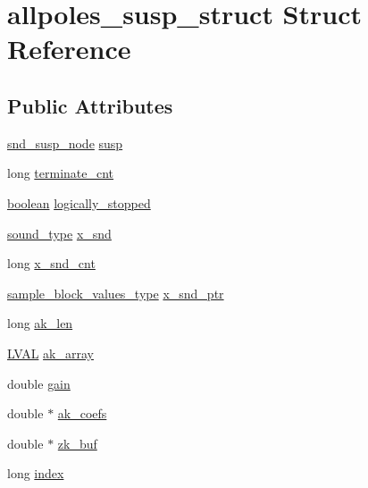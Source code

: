 \hypertarget{structallpoles__susp__struct}{}\section{allpoles\+\_\+susp\+\_\+struct Struct Reference}
\label{structallpoles__susp__struct}
\subsection*{Public Attributes}
\begin{DoxyCompactItemize}
\item 
\hyperlink{sound_8h_a6b268203688a934bd798ceb55f85d4c0}{snd\+\_\+susp\+\_\+node} \hyperlink{structallpoles__susp__struct_a9362e843e7e4cc86704db769e4b7a0ae}{susp}
\item 
long \hyperlink{structallpoles__susp__struct_a1bde6be2baac1d6534ba366a56c4de17}{terminate\+\_\+cnt}
\item 
\hyperlink{cext_8h_a7670a4e8a07d9ebb00411948b0bbf86d}{boolean} \hyperlink{structallpoles__susp__struct_a7bbede0decbc7893b76293aeabc465bd}{logically\+\_\+stopped}
\item 
\hyperlink{sound_8h_a792cec4ed9d6d636d342d9365ba265ea}{sound\+\_\+type} \hyperlink{structallpoles__susp__struct_af59b0583ecdc497b601e1e575b9e2c7e}{x\+\_\+snd}
\item 
long \hyperlink{structallpoles__susp__struct_a2534670add4338a67fed6d4dcfb67ed7}{x\+\_\+snd\+\_\+cnt}
\item 
\hyperlink{sound_8h_a83d17f7b465d1591f27cd28fc5eb8a03}{sample\+\_\+block\+\_\+values\+\_\+type} \hyperlink{structallpoles__susp__struct_aea5dfcb7280aab786a437d7157f22f6f}{x\+\_\+snd\+\_\+ptr}
\item 
long \hyperlink{structallpoles__susp__struct_a29aa697d50583d6db64a67d30b8cbdf2}{ak\+\_\+len}
\item 
\hyperlink{xldmem_8h_a9a9ec6a5fbca2b40ed8d19faa799be8c}{L\+V\+AL} \hyperlink{structallpoles__susp__struct_a9d4a5afcf3bade4bd6d4ce56926f5ba0}{ak\+\_\+array}
\item 
double \hyperlink{structallpoles__susp__struct_a365ab08384c35bab89ff00481a43f3b2}{gain}
\item 
double $\ast$ \hyperlink{structallpoles__susp__struct_ac2ebf26d0f6dcab575ae7c576a197f0f}{ak\+\_\+coefs}
\item 
double $\ast$ \hyperlink{structallpoles__susp__struct_a47455dbded9afab370b62a2efd3f8690}{zk\+\_\+buf}
\item 
long \hyperlink{structallpoles__susp__struct_ac4c43a32b570fe7b76d070a836a5f851}{index}
\end{DoxyCompactItemize}


